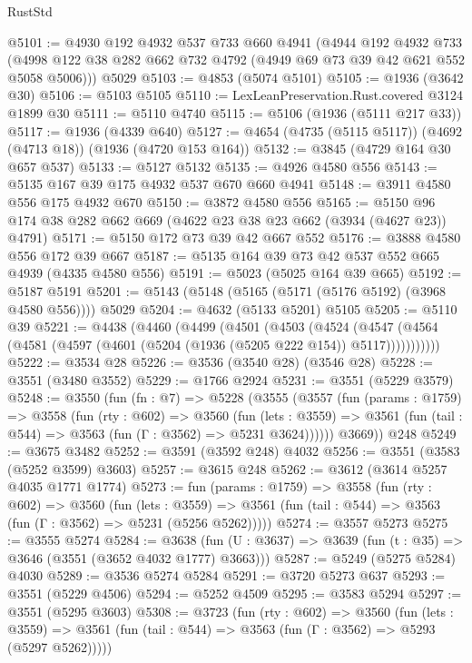 \begin{lexlean}{RustStd}
\begin{coremodule}
@5101 := @4930
    @192
    @4932
    @537
    @733
    @660
    @4941
    (@4944
      @192
      @4932
      @733
      (@4998 @122 @38 @282 @662 @732 @4792 (@4949 @69 @73 @39 @42 @621 @552 @5058 @5006)))
    @5029
@5103 := @4853 (@5074 @5101)
@5105 := @1936 (@3642 @30)
@5106 := @5103 @5105
@5110 := LexLeanPreservation.Rust.covered @3124 @1899 @30
@5111 := @5110 @4740
@5115 := @5106 (@1936 (@5111 @217 @33))
@5117 := @1936 (@4339 @640)
@5127 := @4654 (@4735 (@5115 @5117)) (@4692 (@4713 @18)) (@1936 (@4720 @153 @164))
@5132 := @3845 (@4729 @164 @30 @657 @537)
@5133 := @5127 @5132
@5135 := @4926 @4580 @556
@5143 := @5135 @167 @39 @175 @4932 @537 @670 @660 @4941
@5148 := @3911 @4580 @556 @175 @4932 @670
@5150 := @3872 @4580 @556
@5165 := @5150 @96 @174 @38 @282 @662 @669 (@4622 @23 @38 @23 @662 (@3934 (@4627 @23)) @4791)
@5171 := @5150 @172 @73 @39 @42 @667 @552
@5176 := @3888 @4580 @556 @172 @39 @667
@5187 := @5135 @164 @39 @73 @42 @537 @552 @665 @4939 (@4335 @4580 @556)
@5191 := @5023 (@5025 @164 @39 @665)
@5192 := @5187 @5191
@5201 := @5143 (@5148 (@5165 (@5171 (@5176 @5192) (@3968 @4580 @556)))) @5029
@5204 := @4632 (@5133 @5201) @5105
@5205 := @5110 @39
@5221 := @4438
    (@4460
      (@4499
        (@4501
          (@4503
            (@4524
              (@4547 (@4564 (@4581 (@4597 (@4601 (@5204 (@1936 (@5205 @222 @154)) @5117)))))))))))
@5222 := @3534 @28
@5226 := @3536 (@3540 @28) (@3546 @28)
@5228 := @3551 (@3480 @3552)
@5229 := @1766 @2924
@5231 := @3551 (@5229 @3579)
@5248 := @3550
    (fun (fn : @7) =>
    @5228
      (@3555
        (@3557
          (fun (params : @1759) =>
          @3558
            (fun (rty : @602) =>
            @3560
              (fun (lets : @3559) =>
              @3561 (fun (tail : @544) => @3563 (fun (Γ : @3562) => @5231 @3624))))))
        @3669))
    @248
@5249 := @3675 @3482
@5252 := @3591 (@3592 @248) @4032
@5256 := @3551 (@3583 (@5252 @3599) @3603)
@5257 := @3615 @248
@5262 := @3612 (@3614 @5257 @4035 @1771 @1774)
@5273 := fun (params : @1759) =>
  @3558
    (fun (rty : @602) =>
    @3560
      (fun (lets : @3559) =>
      @3561 (fun (tail : @544) => @3563 (fun (Γ : @3562) => @5231 (@5256 @5262)))))
@5274 := @3557 @5273
@5275 := @3555 @5274
@5284 := @3638 (fun (U : @3637) => @3639 (fun (t : @35) => @3646 (@3551 (@3652 @4032 @1777) @3663)))
@5287 := @5249 (@5275 @5284) @4030
@5289 := @3536 @5274 @5284
@5291 := @3720 @5273 @637
@5293 := @3551 (@5229 @4506)
@5294 := @5252 @4509
@5295 := @3583 @5294
@5297 := @3551 (@5295 @3603)
@5308 := @3723
    (fun (rty : @602) =>
    @3560
      (fun (lets : @3559) =>
      @3561 (fun (tail : @544) => @3563 (fun (Γ : @3562) => @5293 (@5297 @5262)))))

\end{coremodule}
\end{lexlean}
